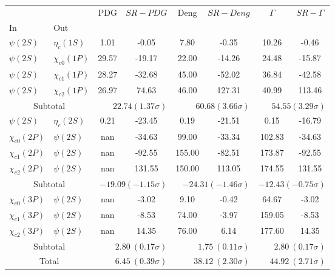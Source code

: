 \begin{tabular}{|l|l|c|c|c|c|c|c|}%
\hline%
&&PDG&$SR-PDG$&Deng&$SR-Deng$&$\Gamma$&$SR-\Gamma$\\%
In&Out&&&&&&\\%
\hline%
$\psi(2S)$&$\eta_{c}(1S)$&1.01&-0.05&7.80&-0.35&10.26&-0.46\\%
$\psi(2S)$&$\chi_{c0}(1P)$&29.57&-19.17&22.00&-14.26&24.48&-15.87\\%
$\psi(2S)$&$\chi_{c1}(1P)$&28.27&-32.68&45.00&-52.02&36.84&-42.58\\%
$\psi(2S)$&$\chi_{c2}(1P)$&26.97&74.63&46.00&127.31&40.99&113.46\\%
\hline%
\hline%
\multicolumn{2}{|c|}{Subtotal}&\multicolumn{2}{|r|}{$22.74 (1.37\sigma)$}&\multicolumn{2}{|r|}{$60.68 (3.66\sigma)$}&\multicolumn{2}{|r|}{$54.55 (3.29\sigma)$}\\%
\hline%
\hline%
$\psi(2S)$&$\eta_{c}(2S)$&0.21&-23.45&0.19&-21.51&0.15&-16.79\\%
$\chi_{c0}(2P)$&$\psi(2S)$&nan&-34.63&99.00&-33.34&102.83&-34.63\\%
$\chi_{c1}(2P)$&$\psi(2S)$&nan&-92.55&155.00&-82.51&173.87&-92.55\\%
$\chi_{c2}(2P)$&$\psi(2S)$&nan&131.55&150.00&113.05&174.55&131.55\\%
\hline%
\hline%
\multicolumn{2}{|c|}{Subtotal}&\multicolumn{2}{|r|}{$-19.09 (-1.15\sigma)$}&\multicolumn{2}{|r|}{$-24.31 (-1.46\sigma)$}&\multicolumn{2}{|r|}{$-12.43 (-0.75\sigma)$}\\%
\hline%
\hline%
$\chi_{c0}(3P)$&$\psi(2S)$&nan&-3.02&9.10&-0.42&64.67&-3.02\\%
$\chi_{c1}(3P)$&$\psi(2S)$&nan&-8.53&74.00&-3.97&159.05&-8.53\\%
$\chi_{c2}(3P)$&$\psi(2S)$&nan&14.35&76.00&6.14&177.60&14.35\\%
\hline%
\hline%
\multicolumn{2}{|c|}{Subtotal}&\multicolumn{2}{|r|}{$2.80~(0.17\sigma)$}&\multicolumn{2}{|r|}{$1.75~(0.11\sigma)$}&\multicolumn{2}{|r|}{$2.80~(0.17\sigma)$}\\%
\hline%
\hline%
\multicolumn{2}{|c|}{Total}&\multicolumn{2}{|r|}{$6.45~(0.39\sigma)$}&\multicolumn{2}{|r|}{$38.12~(2.30\sigma)$}&\multicolumn{2}{|r|}{$44.92~(2.71\sigma)$}\\%
\hline%
\end{tabular}